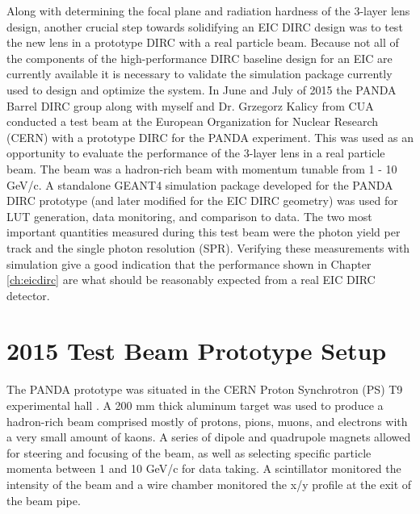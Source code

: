 \label{ch:analysis}

Along with determining the focal plane and radiation hardness of the 3-layer lens design, another crucial step towards solidifying an EIC DIRC design was to test the new lens in a prototype DIRC with a real particle beam. Because not all of the components of the high-performance DIRC baseline design for an EIC are currently available it is necessary to validate the simulation package currently used to design and optimize the system. In June and July of 2015 the PANDA Barrel DIRC group along with myself and Dr. Grzegorz Kalicy from CUA conducted a test beam at the European Organization for Nuclear Research (CERN) with a prototype DIRC for the PANDA experiment. This was used as an opportunity to evaluate the performance of the 3-layer lens in a real particle beam. The beam was a hadron-rich beam with momentum tunable from 1 - 10 GeV/c. A standalone GEANT4 simulation package developed for the PANDA DIRC prototype (and later modified for the EIC DIRC geometry) was used for LUT generation, data monitoring, and comparison to data.
The two most important quantities measured during this test beam were the photon yield per track and the single photon resolution (SPR). Verifying these measurements with simulation give a good indication that the performance shown in Chapter \ref{ch:eicdirc} are what should be reasonably expected from a real EIC DIRC detector.

\section{2015 Test Beam Prototype Setup}
The PANDA prototype was situated in the CERN Proton Synchrotron (PS) T9 experimental hall \cite{CERN_T9}. A 200 mm thick aluminum target was used to produce a hadron-rich beam comprised mostly of protons, pions, muons, and electrons with a very small amount of kaons. A series of dipole and quadrupole magnets allowed for steering and focusing of the beam, as well as selecting specific particle momenta between 1 and 10 GeV/c for data taking. A scintillator monitored the intensity of the beam and a wire chamber monitored the x/y profile at the exit of the beam pipe.

